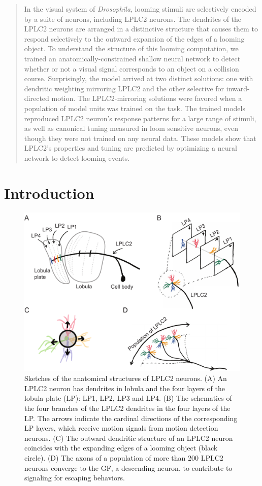 \documentclass[pdftex,9pt,lineno]{elife}
\begin{document}
\begin{abstract}
In the visual system of \textit{Drosophila}, looming stimuli are selectively encoded by a suite of neurons, including LPLC2 neurons. The dendrites of the LPLC2 neurons are arranged in a distinctive structure that causes them to respond selectively to the outward expansion of the edges of a looming object. To understand the structure of this looming computation, we trained an anatomically-constrained shallow neural network to detect whether or not a visual signal corresponds to an object on a collision course. Surprisingly, the model arrived at two distinct solutions: one with dendritic weighting mirroring LPLC2 and the other selective for inward-directed motion. The LPLC2-mirroring solutions were favored when a population of model units was trained on the task. The trained models reproduced LPLC2 neuron’s response patterns for a large range of stimuli, as well as canonical tuning measured in loom sensitive neurons, even though they were not trained on any neural data. These models show that LPLC2's properties and tuning are predicted by optimizing a neural network to detect looming events.
\end{abstract}


\section{Introduction}

\begin{figure}
\includegraphics[width=\linewidth]{figures/anatomy_paper.pdf}
\caption{Sketches of the anatomical structures of LPLC2 neurons. (A) An LPLC2 neuron has dendrites in lobula and the four layers of the lobula plate (LP): LP1, LP2, LP3 and LP4. (B) The schematics of the four branches of the LPLC2 dendrites in the four layers of the LP. The arrows indicate the cardinal directions of the corresponding LP layers, which receive motion signals from motion detection neurons. (C) The outward dendritic structure of an LPLC2 neuron coincides with the expanding edges of a looming object (black circle). (D) The axons of a population of more than 200 LPLC2 neurons converge to the GF, a descending neuron, to contribute to signaling for escaping behaviors.}
\label{fig:anatomy}
\end{figure}
\end{document}
